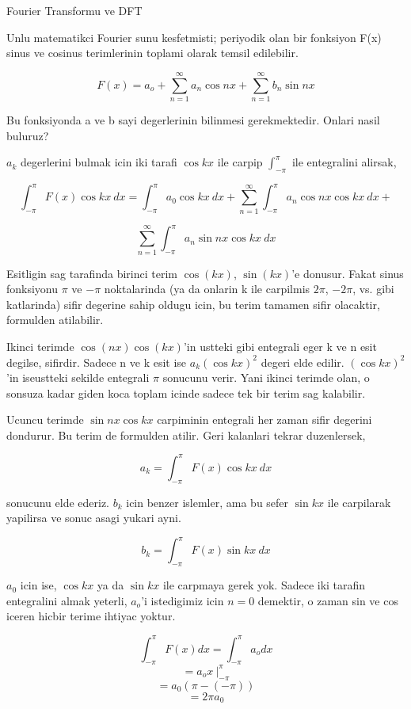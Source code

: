 \documentclass[12pt,fleqn]{article}\usepackage{../common}
\begin{document}
Fourier Transformu ve DFT

Unlu matematikci Fourier sunu kesfetmisti; periyodik olan bir fonksiyon F(x)
sinus ve cosinus terimlerinin toplami olarak temsil edilebilir.

$$ F(x) = a_o + \sum_{n=1}^{\infty}a_n \cos nx + \sum_{n=1}^{\infty}b_n \sin nx  $$

Bu fonksiyonda a ve b sayi degerlerinin bilinmesi gerekmektedir. Onlari nasil
buluruz? 

$a_k$ degerlerini bulmak icin iki tarafi $\cos kx$ ile carpip
$\int_{-\pi}^{\pi}$ ile entegralini alirsak,

$$ \int_{-\pi}^{\pi} F(x)\cos kx \ dx = \int_{-\pi}^{\pi} a_0 \cos
kx \ dx +  \sum_{n=1}^{\infty}\int_{-\pi}^{\pi} a_n \cos nx \cos kx \ dx +   $$

$$ \sum_{n=1}^{\infty}\int_{-\pi}^{\pi} a_n \sin nx \cos kx \ dx   $$

Esitligin sag tarafinda birinci terim $\cos(kx)$, $\sin(kx)$'e donusur. Fakat sinus
fonksiyonu $\pi$ ve $-\pi$ noktalarinda (ya da onlarin k ile carpilmis $2\pi$,
$-2\pi$, vs. gibi katlarinda) sifir degerine sahip oldugu icin, bu terim tamamen
sifir olacaktir, formulden atilabilir.

Ikinci terimde $\cos(nx)\cos(kx)$'in ustteki gibi entegrali eger k ve n esit
degilse, sifirdir. Sadece n ve k esit ise $a_k(\cos kx)^2$ degeri elde edilir.
$(\cos kx)^2$'in iseustteki sekilde entegrali $\pi$ sonucunu verir. Yani ikinci
terimde olan, o sonsuza kadar giden koca toplam icinde sadece tek bir terim sag
kalabilir.

Ucuncu terimde $\sin nx \cos kx$ carpiminin entegrali her zaman
sifir degerini dondurur. Bu terim de formulden atilir. Geri kalanlari tekrar
duzenlersek, 

$$ a_k = \int_{-\pi}^{\pi} F(x)\cos kx \ dx $$

sonucunu elde ederiz. $b_k$ icin benzer islemler, ama bu sefer $\sin kx$ ile carpilarak yapilirsa ve
sonuc asagi yukari ayni.

$$ b_k = \int_{-\pi}^{\pi} F(x)\sin kx \ dx $$

$a_0$ icin ise, $\cos kx$ ya da $\sin kx$ ile carpmaya gerek yok. Sadece iki
tarafin entegralini almak yeterli, $a_o$'i istedigimiz icin $n=0$ demektir, o
zaman sin ve cos iceren hicbir terime ihtiyac yoktur.

$$  \int_{-\pi}^{\pi} F(x) dx =  \int_{-\pi}^{\pi} a_o dx $$
$$  =  a_o x \ \bigg|_{-\pi}^{\pi}  $$
$$  = a_0 (\pi -(-\pi))  $$
$$  = 2\pi a_0  $$
\end{document}
